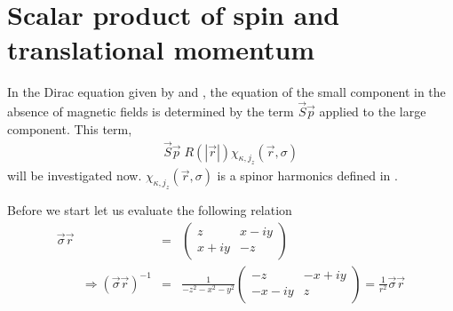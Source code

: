 \documentclass[11pt,a4paper]{report}
\begin{document}
\newpage
\section{Scalar product of spin and translational momentum}
In the Dirac equation given by
 and
,
the equation of the small component in the absence of magnetic fields
is determined by the term $\vec{S}\vec{p}$ applied to the large
component. This term,
\begin{eqnarray*}
\vec{S}\vec{p}\;R(|\vec{r}|)\chi_{\kappa,j_z}(\vec{r},\sigma)
\end{eqnarray*}
will be investigated now. $\chi_{\kappa,j_z}(\vec{r},\sigma)$ is
a spinor harmonics defined in .

Before we start let us evaluate the following relation
\begin{eqnarray}
\vec{\sigma}\vec{r}&=&
\left(\begin{array}{cc} z&x-iy\\x+iy&-z\end{array}\right)
\nonumber\\
\qquad\Rightarrow
(\vec{\sigma}\vec{r})^{-1}&=&\frac{1}{-z^2-x^2-y^2}\left(\begin{array}{cc} -z&-x+iy\\-x-iy&z\end{array}\right)
=\frac{1}{r^2}\vec{\sigma}\vec{r}
\label{eq:sphelper1}
\end{eqnarray}
\end{document}
